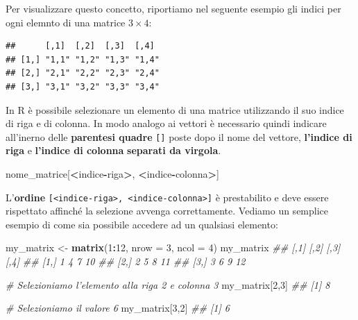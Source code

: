 \documentclass[
]{book}
\newenvironment{Shaded}{\begin{snugshade}}{\end{snugshade}}
\newcommand{\CommentTok}[1]{\textcolor[rgb]{0.56,0.35,0.01}{\textit{#1}}}
\newcommand{\DataTypeTok}[1]{\textcolor[rgb]{0.13,0.29,0.53}{#1}}
\newcommand{\DecValTok}[1]{\textcolor[rgb]{0.00,0.00,0.81}{#1}}
\newcommand{\KeywordTok}[1]{\textcolor[rgb]{0.13,0.29,0.53}{\textbf{#1}}}
\newcommand{\NormalTok}[1]{#1}
\newcommand{\OperatorTok}[1]{\textcolor[rgb]{0.81,0.36,0.00}{\textbf{#1}}}
\newcommand{\StringTok}[1]{\textcolor[rgb]{0.31,0.60,0.02}{#1}}
\begin{document}
Per visualizzare questo concetto, riportiamo nel seguente esempio gli indici per ogni elemnto di una matrice \(3\times4\):

\begin{verbatim}
##      [,1]  [,2]  [,3]  [,4] 
## [1,] "1,1" "1,2" "1,3" "1,4"
## [2,] "2,1" "2,2" "2,3" "2,4"
## [3,] "3,1" "3,2" "3,3" "3,4"
\end{verbatim}

In R è possibile selezionare un elemento di una matrice utilizzando il suo indice di riga e di colonna. In modo analogo ai vettori è necessario quindi indicare all'inerno delle \textbf{parentesi quadre} \texttt{{[}{]}} poste dopo il nome del vettore, \textbf{l'indice di riga} e \textbf{l'indice di colonna} \textbf{separati da virgola}.

\begin{Shaded}
\begin{Highlighting}[]
\NormalTok{nome_matrice[}\OperatorTok{<}\NormalTok{indice}\OperatorTok{-}\NormalTok{riga}\OperatorTok{>}\NormalTok{, }\OperatorTok{<}\NormalTok{indice}\OperatorTok{-}\NormalTok{colonna}\OperatorTok{>}\NormalTok{]}
\end{Highlighting}
\end{Shaded}

L'\textbf{ordine} \texttt{{[}\textless{}indice-riga\textgreater{},\ \textless{}indice-colonna\textgreater{}{]}} è prestabilito e deve essere rispettato affinché la selezione avvenga correttamente. Vediamo un semplice esempio di come sia possibile accedere ad un qualsiasi elemento:

\begin{Shaded}
\begin{Highlighting}[]
\NormalTok{my_matrix <-}\StringTok{ }\KeywordTok{matrix}\NormalTok{(}\DecValTok{1}\OperatorTok{:}\DecValTok{12}\NormalTok{, }\DataTypeTok{nrow =} \DecValTok{3}\NormalTok{, }\DataTypeTok{ncol =} \DecValTok{4}\NormalTok{)}
\NormalTok{my_matrix}
\CommentTok{##      [,1] [,2] [,3] [,4]}
\CommentTok{## [1,]    1    4    7   10}
\CommentTok{## [2,]    2    5    8   11}
\CommentTok{## [3,]    3    6    9   12}

\CommentTok{# Selezioniamo l'elemento alla riga 2 e colonna 3}
\NormalTok{my_matrix[}\DecValTok{2}\NormalTok{,}\DecValTok{3}\NormalTok{]}
\CommentTok{## [1] 8}

\CommentTok{# Selezioniamo il valore 6}
\NormalTok{my_matrix[}\DecValTok{3}\NormalTok{,}\DecValTok{2}\NormalTok{]}
\CommentTok{## [1] 6}
\end{Highlighting}
\end{Shaded}
\end{document}
